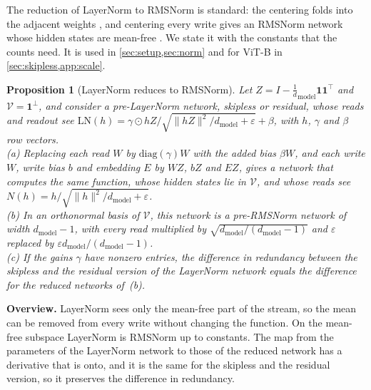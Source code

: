 \documentclass[10pt]{article}
\newtheorem{proposition}[theorem]{Proposition}
\theoremstyle{definition}
\theoremstyle{remark}
\newcommand{\dm}{d_{\mathrm{model}}}
\newcommand{\norm}[1]{\lVert #1\rVert}
\newcommand{\para}[1]{\smallskip\noindent\textbf{#1}\hspace{0.5em}}
\begin{document}
The reduction of LayerNorm to RMSNorm is standard: the centering folds into the adjacent weights \citep{elhage2021circuits}, and centering every write gives an RMSNorm network whose hidden states are mean-free \citep{ashkboos2024slicegpt,theus2025glmc}. We state it with the constants that the counts need. It is used in \cref{sec:setup,sec:norm} and for ViT-B in \cref{sec:skipless,app:scale}.

\begin{proposition}[LayerNorm reduces to RMSNorm]\label{prop:ln}
Let $Z = I - \tfrac1\dm\mathbf 1\mathbf 1^\top$ and $\mathcal V = \mathbf 1^\perp$, and consider a pre-LayerNorm network, skipless or residual, whose reads and readout see $\mathrm{LN}(h) = \gamma\odot hZ/\sqrt{\norm{hZ}^2/\dm + \varepsilon} + \beta$, with $h$, $\gamma$ and $\beta$ row vectors.\\
\textup{(a)} Replacing each read $W$ by $\mathrm{diag}(\gamma)W$ with the added bias $\beta W$, and each write $W$, write bias $b$ and embedding $E$ by $WZ$, $bZ$ and $EZ$, gives a network that computes the same function, whose hidden states lie in $\mathcal V$, and whose reads see $N(h) = h/\sqrt{\norm{h}^2/\dm + \varepsilon}$.\\
\textup{(b)} In an orthonormal basis of $\mathcal V$, this network is a pre-RMSNorm network of width $\dm-1$, with every read multiplied by $\sqrt{\dm/(\dm-1)}$ and $\varepsilon$ replaced by $\varepsilon \dm/(\dm-1)$.\\
\textup{(c)} If the gains $\gamma$ have nonzero entries, the difference in redundancy between the skipless and the residual version of the LayerNorm network equals the difference for the reduced networks of~(b).
\end{proposition}

\para{Overview.} LayerNorm sees only the mean-free part of the stream, so the mean can be removed from every write without changing the function. On the mean-free subspace LayerNorm is RMSNorm up to constants. The map from the parameters of the LayerNorm network to those of the reduced network has a derivative that is onto, and it is the same for the skipless and the residual version, so it preserves the difference in redundancy.
\end{document}
